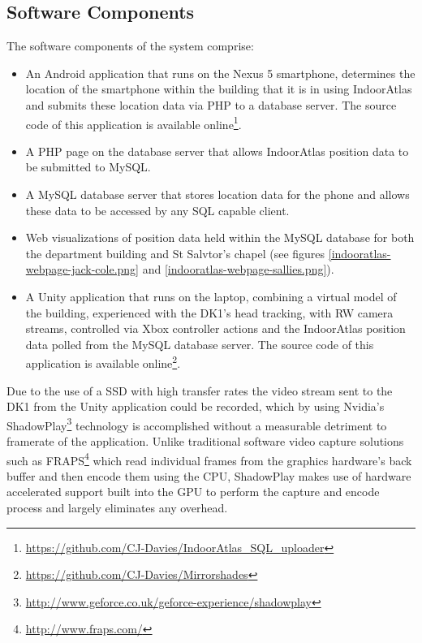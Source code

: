 \subsection{Software Components}
The software components of the system comprise:
\begin{itemize}
	\item An Android application that runs on the Nexus 5 smartphone, determines the location of the smartphone within the building that it is in using IndoorAtlas and submits these location data via PHP to a database server. The source code of this application is available online\footnote{\url{https://github.com/CJ-Davies/IndoorAtlas_SQL_uploader}}.
	\item A PHP page on the database server that allows IndoorAtlas position data to be submitted to MySQL.
	\item A MySQL database server that stores location data for the phone and allows these data to be accessed by any SQL capable client.
	\item Web visualizations of position data held within the MySQL database for both the department building and St Salvtor's chapel (see figures \ref{indooratlas-webpage-jack-cole.png} and \ref{indooratlas-webpage-sallies.png}).
	\item A Unity application that runs on the laptop, combining a virtual model of the building, experienced with the DK1's head tracking, with RW camera streams, controlled via Xbox controller actions and the IndoorAtlas position data polled from the MySQL database server. The source code of this application is available online\footnote{\url{https://github.com/CJ-Davies/Mirrorshades}}.
\end{itemize}

Due to the use of a SSD with high transfer rates the video stream sent to the DK1 from the Unity application could be recorded, which by using Nvidia's ShadowPlay\footnote{\url{http://www.geforce.co.uk/geforce-experience/shadowplay}} technology is accomplished without a measurable detriment to framerate of the application. Unlike traditional software video capture solutions such as FRAPS\footnote{\url{http://www.fraps.com/}} which read individual frames from the graphics hardware's back buffer and then encode them using the CPU, ShadowPlay makes use of hardware accelerated support built into the GPU to perform the capture and encode process and largely eliminates any overhead.

